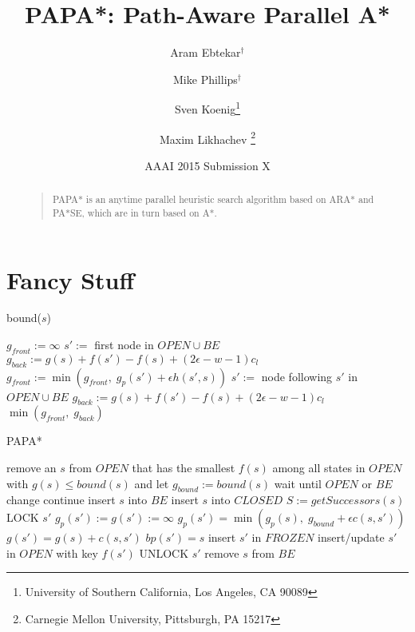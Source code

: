 \documentclass[letterpaper]{article}
\begin{document}
%
\title{PAPA*: Path-Aware Parallel A*}
\author{Aram Ebtekar$^\dagger$ \and Mike Phillips$^\dagger$ \and Sven Koenig\thanks{University of Southern California, Los Angeles, CA 90089} \and Maxim Likhachev%
\thanks{Carnegie Mellon University, Pittsburgh, PA 15217}%
%
}
\author{AAAI 2015 Submission X}%
\maketitle
\begin{abstract}
\begin{quote}
PAPA* is an anytime parallel heuristic search algorithm based on ARA* and PA*SE, which are in turn based on A*.
\end{quote}
\end{abstract}

\section{Fancy Stuff}

\begin{algorithm}
\caption{bound($s$)}
\label{alg:bound}
\begin{algorithmic}
\STATE $g_{front} := \infty$
\STATE $s' :=$ first node in $OPEN \cup BE$
\STATE $g_{back} := g(s) + f(s') - f(s) + (2\epsilon-w-1) c_l$
\STATE $g_{front} := \min(g_{front},\;g_p(s') + \epsilon h(s',s))$
\STATE $s' :=$ node following $s'$ in $OPEN \cup BE$
\STATE $g_{back} := g(s) + f(s') - f(s) + (2\epsilon-w-1) c_l$
\ENDWHILE
\RETURN $\min(g_{front},\;g_{back})$
\end{algorithmic}
\end{algorithm}

\begin{algorithm}
\caption{PAPA*}
\label{alg:PAPA*}
\begin{algorithmic}
\STATE remove an $s$ from $OPEN$ that has the smallest $f(s)$ among all states in $OPEN$ with $g(s) \le bound(s)$ and let $g_{bound} := bound(s)$
\STATE wait until $OPEN$ or $BE$ change
\STATE continue
\ENDIF
\STATE insert $s$ into $BE$
\STATE insert $s$ into $CLOSED$
\STATE $S := getSuccessors(s)$
\STATE LOCK $s'$
\STATE $g_p(s') := g(s') := \infty$
\ENDIF
\STATE $g_p(s') = \min(g_p(s),\; g_{bound} + \epsilon c(s,s'))$
\STATE $g(s') = g(s) + c(s,s')$
\STATE $bp(s') = s$
\STATE insert $s'$ in $FROZEN$
\ELSE
\STATE insert/update $s'$ in $OPEN$ with key $f(s')$
\ENDIF
\ENDIF
\STATE UNLOCK $s'$
\ENDFOR
\STATE remove $s$ from $BE$
\ENDWHILE
\end{algorithmic}
\end{algorithm}
\end{document}
